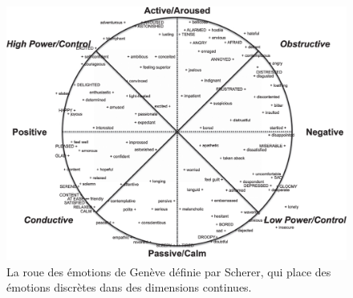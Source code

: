 \begin{figure}
  \centering
  \includegraphics[width=14cm]{./Chapitre1/figures/Genova.png}
  \caption{La roue des émotions de Genève définie par Scherer, qui place des émotions discrètes dans des dimensions continues.}
  \label{fig:Genova}
\end{figure}
